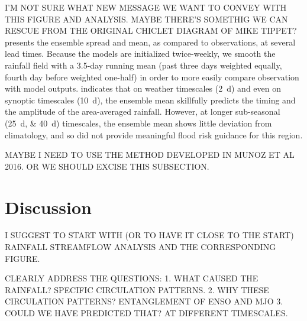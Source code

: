 \documentclass[twocol]{ametsoc}
\begin{document}

I'M NOT SURE WHAT NEW MESSAGE WE WANT TO CONVEY WITH THIS FIGURE AND ANALYSIS. MAYBE THERE'S SOMETHIG WE CAN RESCUE FROM THE ORIGINAL CHICLET DIAGRAM OF MIKE TIPPET?
 presents the ensemble spread and mean, as compared to observations, at several lead times. Because the models are initialized twice-weekly, we smooth the rainfall field with a 3.5-day running mean (past three days weighted equally, fourth day before weighted one-half) in order to more easily compare observation with model outputs.
 indicates that on weather timescales (\SI{2}{\day}) and even on synoptic timescales (\SI{10}{\day}), the ensemble mean skillfully predicts the timing and the amplitude of the area-averaged rainfall.
However, at longer sub-seasonal (\SIlist{25;40}{\day}) timescales, the ensemble mean shows little deviation from climatology, and so did not provide meaningful flood risk guidance for this region.

MAYBE I NEED TO USE THE METHOD DEVELOPED IN MUNOZ ET AL 2016. OR WE SHOULD EXCISE THIS SUBSECTION.

\section{Discussion}
\label{sec:discussion}

I SUGGEST TO START WITH (OR TO HAVE IT CLOSE TO THE START) RAINFALL STREAMFLOW ANALYSIS AND THE CORRESPONDING FIGURE.

CLEARLY ADDRESS THE QUESTIONS:
1. WHAT CAUSED THE RAINFALL? SPECIFIC CIRCULATION PATTERNS.
2. WHY THESE CIRCULATION PATTERNS? ENTANGLEMENT OF ENSO AND MJO
3. COULD WE HAVE PREDICTED THAT? AT DIFFERENT TIMESCALES.
\end{document}
